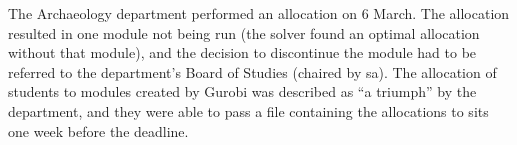 The Archaeology department performed an allocation on 6 March. The allocation
resulted in one module not being run (the solver found an optimal allocation
without that module), and the decision to discontinue the module had to be
referred to the department's Board of Studies (chaired by \gls{sa}). The
allocation of students to modules created by Gurobi was described as ``a
triumph'' by the department, and they were able to pass a file containing the
allocations to \gls{sits} one week before the deadline.


